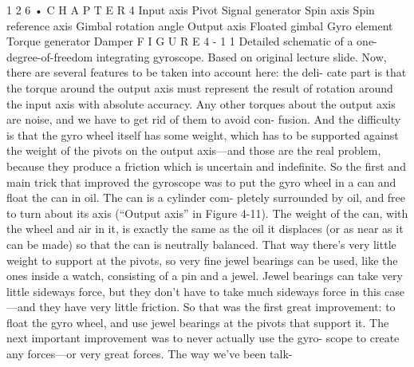 \documentclass[10pt,oneside]{article}
\begin{document}
1 2 6 • C H A P T E R  4 Input axis Pivot Signal generator Spin axis Spin reference axis Gimbal rotation angle Output axis Floated gimbal Gyro element Torque generator Damper F I G U R E  4 - 1 1 Detailed schematic of a one-degree-of-freedom integrating gyroscope. Based on original lecture slide. Now, there are several features to be taken into account here: the deli- cate part is that the torque around the output axis must represent the result of rotation around the input axis with absolute accuracy. Any other torques about the output axis are noise, and we have to get rid of them to avoid con- fusion. And the difficulty is that the gyro wheel itself has some weight, which has to be supported against the weight of the pivots on the output axis---and those are the real problem, because they produce a friction which is uncertain and indefinite. So the first and main trick that improved the gyroscope was to put the gyro wheel in a can and float the can in oil. The can is a cylinder com- pletely surrounded by oil, and free to turn about its axis (“Output axis” in Figure 4-11).  The weight of the can, with the wheel and air in it, is exactly the same as the oil it displaces (or as near as it can be made) so that the can is neutrally balanced. That way there’s very little weight to support at the pivots, so very fine jewel bearings can be used, like the ones inside a watch, consisting of a pin and a jewel. Jewel bearings can take very little sideways force, but they don’t have to take much sideways force in this case---and they have very little friction. So that was the first great improvement: to float the gyro wheel, and use jewel bearings at the pivots that support it. The next important improvement was to never actually use the gyro- scope to create any forces---or very great forces. The way we’ve been talk-\par
\end{document}
